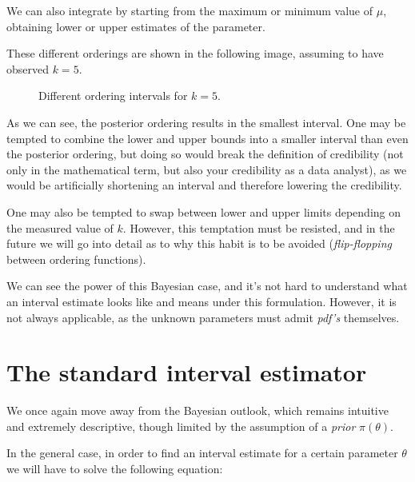 \begin{example}
	We can also integrate by starting from the maximum or minimum value of $\mu$, obtaining lower or upper estimates of the parameter. 
	
	These different orderings are shown in the following image, assuming to have observed $k=5$.
	
	\begin{figure}[H]
		\centering
		
		\caption{Different ordering intervals for $k=5$.}
		\label{fig:bayes_interval}
	\end{figure}
	
	
	
	As we can see, the posterior ordering results in the smallest interval. One may be tempted to combine the lower and upper bounds into a smaller interval than even the posterior ordering, but doing so would break the definition of credibility (not only in the mathematical term, but also your credibility as a data analyst), as we would be artificially shortening an interval and therefore lowering the credibility. 
	
	One may also be tempted to swap between lower and upper limits depending on the measured value of $k$. However, this temptation must be resisted, and in the future we will go into detail as to why this habit is to be avoided (\emph{flip-flopping} between ordering functions).
\end{example}

We can see the power of this Bayesian case, and it's not hard to understand what an interval estimate looks like and means under this formulation. However, it is not always applicable, as the unknown parameters must admit \emph{pdf's} themselves.

\section{The standard interval estimator}

We once again move away from the Bayesian outlook, which remains intuitive and extremely descriptive, though limited by the assumption of a \emph{prior} $\pi(\theta)$.

In the general case, in order to find an interval estimate for a certain parameter $\theta$ we will have to solve the following equation:

